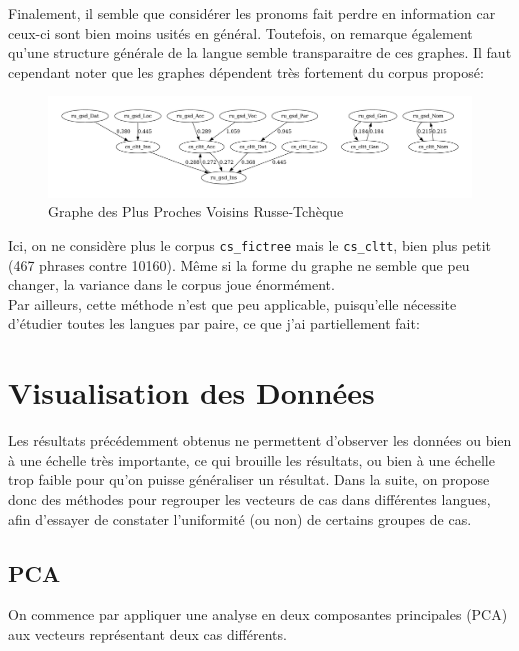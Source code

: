 \documentclass{cours}
\begin{document}
    Finalement, il semble que considérer les pronoms fait perdre en information car ceux-ci sont bien moins usités en général. Toutefois, on remarque également qu'une structure générale de la langue semble transparaitre de ces graphes.
    Il faut cependant noter que les graphes dépendent très fortement du corpus proposé:
    \begin{figure}[H]
	    \centering
	    \includegraphics[width=\textwidth]{Figures/GNN/gnn_ru_gsd_cs_cltt}
	    \caption{Graphe des Plus Proches Voisins Russe-Tchèque}
    \end{figure}
    Ici, on ne considère plus le corpus \texttt{cs\_fictree} mais le \texttt{cs\_cltt}, bien plus petit (467 phrases contre 10160).
    Même si la forme du graphe ne semble que peu changer, la variance dans le corpus joue énormément.\\
    Par ailleurs, cette méthode n'est que peu applicable, puisqu'elle nécessite d'étudier toutes les langues par paire, ce que j'ai partiellement fait: %

\section{Visualisation des Données}
    Les résultats précédemment obtenus ne permettent d'observer les données ou bien à une échelle très importante, ce qui brouille les résultats, ou bien à une échelle trop faible pour qu'on puisse généraliser un résultat.
    Dans la suite, on propose donc des méthodes pour regrouper les vecteurs de cas dans différentes langues, afin d'essayer de constater l'uniformité (ou non) de certains groupes de cas.

    \subsection{PCA}
    On commence par appliquer une analyse en deux composantes principales (PCA) aux vecteurs représentant deux cas différents.
\end{document}
